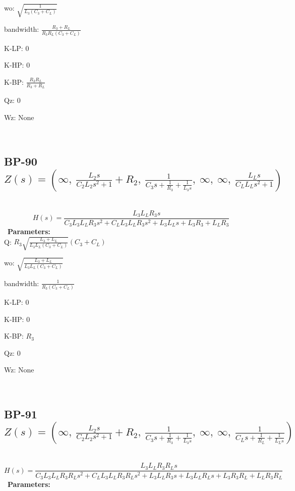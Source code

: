 \documentclass{article}
\begin{document}
wo: $\sqrt{\frac{1}{L_{3} \left(C_{3} + C_{L}\right)}}$\ 

bandwidth: $\frac{R_{3} + R_{L}}{R_{3} R_{L} \left(C_{3} + C_{L}\right)}$\ 

K-LP: $0$\ 

K-HP: $0$\ 

K-BP: $\frac{R_{3} R_{L}}{R_{3} + R_{L}}$\ 

Qz: $0$\ 

Wz: $\text{None}$\ 

\ 

\subsection{BP-90 $Z(s) = \left( \infty, \  \frac{L_{2} s}{C_{2} L_{2} s^{2} + 1} + R_{2}, \  \frac{1}{C_{3} s + \frac{1}{R_{3}} + \frac{1}{L_{3} s}}, \  \infty, \  \infty, \  \frac{L_{L} s}{C_{L} L_{L} s^{2} + 1}\right)$ } \ 
\textbf{\[H(s) = \frac{L_{3} L_{L} R_{3} s}{C_{3} L_{3} L_{L} R_{3} s^{2} + C_{L} L_{3} L_{L} R_{3} s^{2} + L_{3} L_{L} s + L_{3} R_{3} + L_{L} R_{3}}\] } \ 
\textbf{Parameters:}\\ 

Q: $R_{3} \sqrt{\frac{L_{3} + L_{L}}{L_{3} L_{L} \left(C_{3} + C_{L}\right)}} \left(C_{3} + C_{L}\right)$\ 

wo: $\sqrt{\frac{L_{3} + L_{L}}{L_{3} L_{L} \left(C_{3} + C_{L}\right)}}$\ 

bandwidth: $\frac{1}{R_{3} \left(C_{3} + C_{L}\right)}$\ 

K-LP: $0$\ 

K-HP: $0$\ 

K-BP: $R_{3}$\ 

Qz: $0$\ 

Wz: $\text{None}$\ 

\ 

\subsection{BP-91 $Z(s) = \left( \infty, \  \frac{L_{2} s}{C_{2} L_{2} s^{2} + 1} + R_{2}, \  \frac{1}{C_{3} s + \frac{1}{R_{3}} + \frac{1}{L_{3} s}}, \  \infty, \  \infty, \  \frac{1}{C_{L} s + \frac{1}{R_{L}} + \frac{1}{L_{L} s}}\right)$ } \ 
\textbf{\[H(s) = \frac{L_{3} L_{L} R_{3} R_{L} s}{C_{3} L_{3} L_{L} R_{3} R_{L} s^{2} + C_{L} L_{3} L_{L} R_{3} R_{L} s^{2} + L_{3} L_{L} R_{3} s + L_{3} L_{L} R_{L} s + L_{3} R_{3} R_{L} + L_{L} R_{3} R_{L}}\] } \ 
\textbf{Parameters:}\\ 
\end{document}
